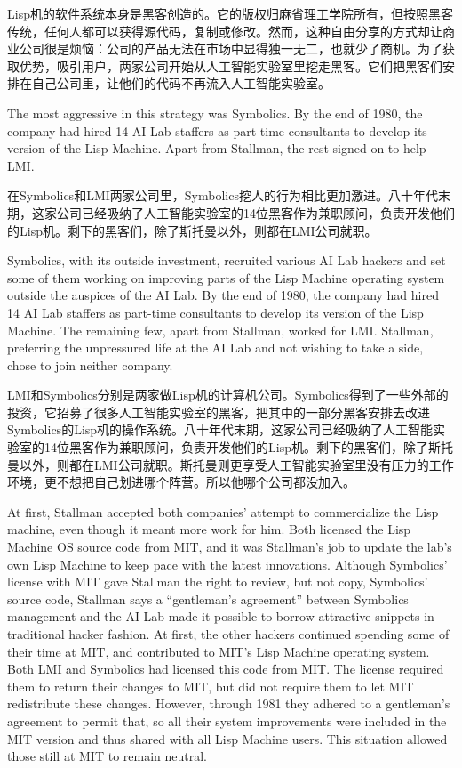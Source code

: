\ifdefined\chs
Lisp机的软件系统本身是黑客创造的。它的版权归麻省理工学院所有，但按照黑客传统，任何人都可以获得源代码，复制或修改。然而，这种自由分享的方式却让商业公司很是烦恼：公司的产品无法在市场中显得独一无二，也就少了商机。为了获取优势，吸引用户，两家公司开始从人工智能实验室里挖走黑客。它们把黑客们安排在自己公司里，让他们的代码不再流入人工智能实验室。
\fi

\ifdefined\eng
The most aggressive in this strategy was Symbolics. By the end of 1980, the company had hired 14 AI Lab staffers as part-time consultants to develop its version of the Lisp Machine. Apart from Stallman, the rest signed on to help LMI.\endnote{}
\fi

\ifdefined\chs
在Symbolics和LMI两家公司里，Symbolics挖人的行为相比更加激进。八十年代末期，这家公司已经吸纳了人工智能实验室的14位黑客作为兼职顾问，负责开发他们的Lisp机。剩下的黑客们，除了斯托曼以外，则都在LMI公司就职。
\fi
\fi

\ifdefined\vtwo
\ifdefined\eng
Symbolics, with its outside investment, recruited various AI Lab hackers and set some of them working on improving parts of the Lisp Machine operating system outside the auspices of the AI Lab. By the end of 1980, the company had hired 14 AI Lab staffers as part-time consultants to develop its version of the Lisp Machine. The remaining few, apart from Stallman, worked for LMI.  Stallman, preferring the unpressured life at the AI Lab and not wishing to take a side, chose to join neither company.
\fi

\ifdefined\chs
LMI和Symbolics分别是两家做Lisp机的计算机公司。Symbolics得到了一些外部的投资，它招募了很多人工智能实验室的黑客，把其中的一部分黑客安排去改进Symbolics的Lisp机的操作系统。八十年代末期，这家公司已经吸纳了人工智能实验室的14位黑客作为兼职顾问，负责开发他们的Lisp机。剩下的黑客们，除了斯托曼以外，则都在LMI公司就职。斯托曼则更享受人工智能实验室里没有压力的工作环境，更不想把自己划进哪个阵营。所以他哪个公司都没加入。
\fi
\fi

\ifdefined\eng
\ifdefined\vone
At first, Stallman accepted both companies' attempt to commercialize the Lisp machine, even though it meant more work for him. Both licensed the Lisp Machine OS source code from MIT, and it was Stallman's job to update the lab's own Lisp Machine to keep pace with the latest innovations. Although Symbolics' license with MIT gave Stallman the right to review, but not copy, Symbolics' source code, Stallman says a ``gentleman's agreement'' between Symbolics management and the AI Lab made it possible to borrow attractive snippets in traditional hacker fashion.
\fi
\ifdefined\vtwo
At first, the other hackers continued spending some of their time at MIT, and contributed to MIT's Lisp Machine operating system. Both LMI and Symbolics had licensed this code from MIT. The license required them to return their changes to MIT, but did not require them to let MIT redistribute these changes.  However, through 1981 they adhered to a gentleman's agreement to permit that, so all their system improvements were included in the MIT version and thus shared with all Lisp Machine users. This situation allowed those still at MIT to remain neutral.
\fi
\fi

